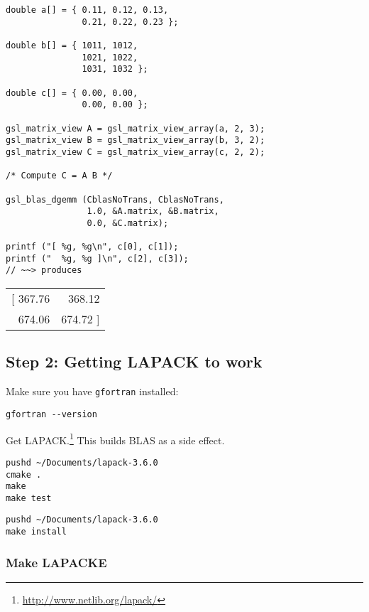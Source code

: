 \documentclass[10pt,oneside,x11names]{article}
\begin{document}
\begin{verbatim}
double a[] = { 0.11, 0.12, 0.13,
               0.21, 0.22, 0.23 };

double b[] = { 1011, 1012,
               1021, 1022,
               1031, 1032 };

double c[] = { 0.00, 0.00,
               0.00, 0.00 };

gsl_matrix_view A = gsl_matrix_view_array(a, 2, 3);
gsl_matrix_view B = gsl_matrix_view_array(b, 3, 2);
gsl_matrix_view C = gsl_matrix_view_array(c, 2, 2);

/* Compute C = A B */

gsl_blas_dgemm (CblasNoTrans, CblasNoTrans,
                1.0, &A.matrix, &B.matrix,
                0.0, &C.matrix);

printf ("[ %g, %g\n", c[0], c[1]);
printf ("  %g, %g ]\n", c[2], c[3]);
// ~~> produces
\end{verbatim}

\begin{center}
\begin{tabular}{rr}
[ 367.76 & 368.12\\
674.06 & 674.72 ]\\
\end{tabular}
\end{center}


\subsection{Step 2: Getting LAPACK to work}
\label{sec:orgheadline19}

Make sure you have \texttt{gfortran} installed:

\begin{verbatim}
gfortran --version
\end{verbatim}

Get LAPACK.\footnote{\url{http://www.netlib.org/lapack/}}
This builds BLAS as a side effect.

\begin{verbatim}
pushd ~/Documents/lapack-3.6.0
cmake .
make
make test
\end{verbatim}

\begin{verbatim}
pushd ~/Documents/lapack-3.6.0
make install
\end{verbatim}

\subsubsection{Make LAPACKE}
\label{sec:orgheadline18}
\end{document}
